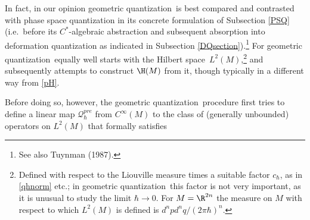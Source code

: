 \documentclass[12pt]{article}
\newcommand{\ca}{$C^*$-algebra} \newcommand{\jba}{JB-algebra}
\newcommand{\Hs}{Hilbert space} \newcommand{\Bs}{Banach space}
\newcommand{\raw}{\rightarrow} \newcommand{\rat}{\mapsto}
\newcommand{\cin}{C^{\infty}} \newcommand{\cci}{C^{\infty}_c}
\newcommand{\qp}{\CQ_{\hbar}^{\mbox{\tiny pos}}}
\newcommand{\er}{\eqref}
\newcommand{\CQ}{{\mathcal Q}} \newcommand{\CR}{{\mathcal R}}
\renewcommand{\qp}{\CQ^{pre}_{\hbar}}
\newcommand{\gq}{geometric quantization}
\begin{document}
In fact, in our opinion \gq\ is best compared and contrasted with phase space quantization in its concrete formulation of Subsection \ref{PSQ} (i.e.\ before its \ca ic abstraction and subsequent absorption into deformation quantization as indicated in Subsection \ref{DQsection}).\footnote{See also Tuynman (1987).} For \gq\ equally well starts with the \Hs\ $L^2(M)$,\footnote{Defined with respect to the Liouville measure times a suitable factor $c_{\hbar}$, as in \er{qhnorm} etc.;  in \gq\ this factor is not very important, as it is unusual to study the limit $\hbar\raw 0$. For $M=\R^{2n}$ the measure on $M$ with respect to which $L^2(M)$ is defined is $d^npd^nq/(2\pi\hbar)^n$.
} and subsequently attempts to construct $\H(M)$ from it, though typically in a different way from \er{pH}. 

Before doing so, however, the \gq\ procedure first tries to define a linear map $\qp$ from $\cin(M)$ to the class of (generally unbounded) operators on $L^2(M)$ that formally satisfies 
\end{document}
